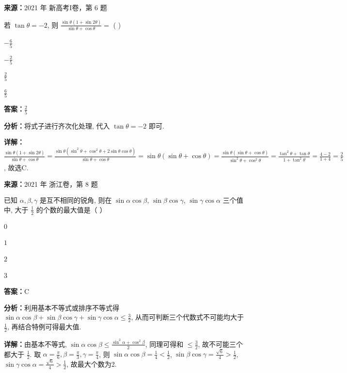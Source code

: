 \begin{question}[points=5]
\textbf{来源：}2021 年 新高考I卷，第 6 题\par
若 $\tan\theta = -2$, 则 $\frac{\sin\theta(1 + \sin2\theta)}{\sin\theta + \cos\theta} =$ ( )
\begin{choices}
  \item $-\frac{6}{5}$
  \item $-\frac{2}{5}$
  \item $\frac{2}{5}$
  \item $\frac{6}{5}$
\end{choices}
\begin{solution}
\textbf{答案：}$\frac{2}{5}$

\textbf{分析：}将式子进行齐次化处理, 代入 $\tan\theta = -2$ 即可.

\textbf{详解：}$\frac{\sin\theta(1 + \sin2\theta)}{\sin\theta + \cos\theta} = \frac{\sin\theta(\sin^2\theta + \cos^2\theta + 2\sin\theta\cos\theta)}{\sin\theta + \cos\theta} = \sin\theta(\sin\theta + \cos\theta) = \frac{\sin\theta(\sin\theta + \cos\theta)}{\sin^2\theta + \cos^2\theta} = \frac{\tan^2\theta + \tan\theta}{1 + \tan^2\theta} = \frac{4 - 2}{1 + 4} = \frac{2}{5}$, 故选C.
\end{solution}
\end{question}

\begin{question}[points=4]
\textbf{来源：}2021 年 浙江卷，第 8 题\par
已知 $\alpha,\beta,\gamma$ 是互不相同的锐角, 则在 $\sin\alpha\cos\beta$, $\sin\beta\cos\gamma$, $\sin\gamma\cos\alpha$ 三个值中, 大于 $\frac{1}{2}$ 的个数的最大值是（   ）
\begin{choices}
  \item $0$
  \item $1$
  \item $2$
  \item $3$
\end{choices}
\begin{solution}
\textbf{答案：}C

\textbf{分析：}利用基本不等式或排序不等式得 $\sin\alpha\cos\beta+\sin\beta\cos\gamma+\sin\gamma\cos\alpha \leq \frac{3}{2}$, 从而可判断三个代数式不可能均大于 $\frac{1}{2}$, 再结合特例可得最大值.

\textbf{详解：}由基本不等式, $\sin\alpha\cos\beta \leq \frac{\sin^2\alpha+\cos^2\beta}{2}$, 同理可得和 $\leq \frac{3}{2}$, 故不可能三个都大于 $\frac{1}{2}$. 取 $\alpha=\frac{\pi}{6},\beta=\frac{\pi}{3},\gamma=\frac{\pi}{4}$, 则 $\sin\alpha\cos\beta = \frac{1}{4}<\frac{1}{2}$, $\sin\beta\cos\gamma = \frac{\sqrt{6}}{4}>\frac{1}{2}$, $\sin\gamma\cos\alpha = \frac{\sqrt{6}}{4}>\frac{1}{2}$, 故最大个数为2.
\end{solution}
\end{question}

